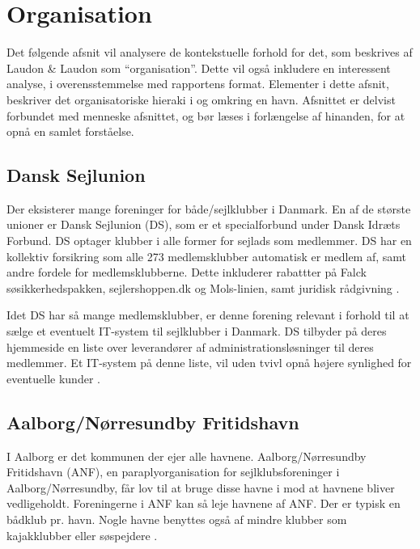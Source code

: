\section{Organisation}

Det følgende afsnit vil analysere de kontekstuelle forhold for det, som beskrives af Laudon \& Laudon som \enquote{organisation}. Dette vil også inkludere en interessent analyse, i overensstemmelse med rapportens format. Elementer i dette afsnit, beskriver det organisatoriske hieraki i og omkring en havn. Afsnittet er delvist forbundet med menneske afsnittet, og bør læses i forlængelse af hinanden, for at opnå en samlet forståelse.


\subsection{Dansk Sejlunion} %
\label{sub:Dansk_Sejlunion}

Der eksisterer mange foreninger for både/sejlklubber i Danmark. En af de største unioner er Dansk Sejlunion (DS), som er et specialforbund under Dansk Idræts Forbund. DS optager klubber i alle former for sejlads som medlemmer. DS har en kollektiv forsikring som alle 273 medlemsklubber automatisk er medlem af, samt andre fordele for medlemsklubberne. Dette inkluderer rabattter på Falck søsikkerhedspakken, sejlershoppen.dk og Mols-linien, samt juridisk rådgivning \cite{ds_optagelse,ds_fordele}.

Idet DS har så mange medlemsklubber, er denne forening relevant i forhold til at sælge et eventuelt IT-system til sejlklubber i Danmark. DS tilbyder på deres hjemmeside en liste over leverandører af administrationsløsninger til deres medlemmer. Et IT-system på denne liste, vil uden tvivl opnå højere synlighed for eventuelle kunder \cite{DanskSejlunionKlubAdmin}.


\subsection{Aalborg/Nørresundby Fritidshavn}

I Aalborg er det kommunen der ejer alle havnene. Aalborg/Nørresundby Fritidshavn (ANF), en paraplyorganisation for sejlklubsforeninger i Aalborg/Nørresundby, får lov til at bruge disse havne i mod at havnene bliver vedligeholdt. Foreningerne i ANF kan så leje havnene af ANF. Der er typisk en bådklub pr. havn. Nogle havne benyttes også af mindre klubber som kajakklubber eller søspejdere  \cite{int_vb_sl}.

